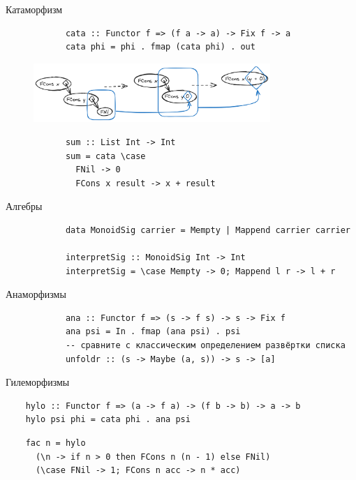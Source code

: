     \begin{frame}[fragile]{Катаморфизм}
        \pause
        \begin{verbatim}
            cata :: Functor f => (f a -> a) -> Fix f -> a
            cata phi = phi . fmap (cata phi) . out
        \end{verbatim}
        \begin{figure}[h]
            \centering
            \includegraphics[width=0.8\textwidth]{figs/cataStep.excalidraw}
        \end{figure}
        \begin{verbatim}
            sum :: List Int -> Int
            sum = cata \case
              FNil -> 0
              FCons x result -> x + result
        \end{verbatim}
    \end{frame}

    \begin{frame}[fragile]{Алгебры}
        \pause
        \begin{verbatim}
            data MonoidSig carrier = Mempty | Mappend carrier carrier

            interpretSig :: MonoidSig Int -> Int
            interpretSig = \case Mempty -> 0; Mappend l r -> l + r
        \end{verbatim}
    \end{frame}

    \begin{frame}[fragile]{Анаморфизмы}
        \pause
        \begin{verbatim}
            ana :: Functor f => (s -> f s) -> s -> Fix f
            ana psi = In . fmap (ana psi) . psi
            -- сравните с классическим определением развёртки списка
            unfoldr :: (s -> Maybe (a, s)) -> s -> [a]
        \end{verbatim}
    \end{frame}

    \begin{frame}[fragile]{Гилеморфизмы}
        \pause
        \begin{verbatim}
    hylo :: Functor f => (a -> f a) -> (f b -> b) -> a -> b
    hylo psi phi = cata phi . ana psi
        \end{verbatim}
        \pause\vspace{1em}
        \begin{verbatim}
    fac n = hylo
      (\n -> if n > 0 then FCons n (n - 1) else FNil)
      (\case FNil -> 1; FCons n acc -> n * acc)
        \end{verbatim}
    \end{frame}

